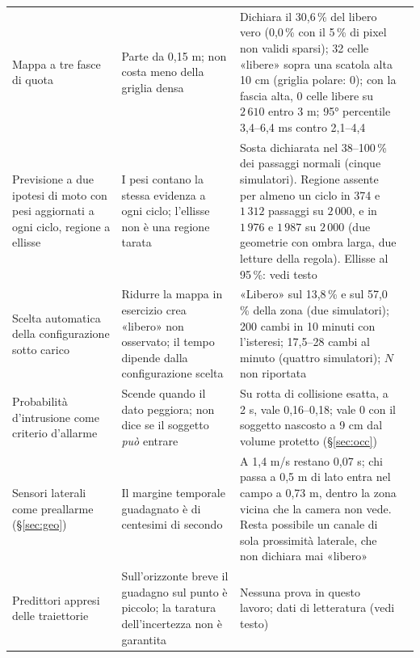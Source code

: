 \begin{table}[H]
\begin{tabularx}{\textwidth}{@{}>{\RaggedRight\arraybackslash}p{3.3cm}>{\RaggedRight\arraybackslash}p{4.4cm}Lc@{}}
Mappa a tre fasce di quota & Parte da 0,15 m; non costa meno della griglia densa & Dichiara il 30,6\,\% del libero vero (0,0\,\% con il 5\,\% di pixel non validi sparsi); 32 celle «libere» sopra una scatola alta 10 cm (griglia polare: 0); con la fascia alta, 0 celle libere su $2\,610$ entro 3 m; 95° percentile 3,4--6,4 ms contro 2,1--4,4 &  \\
Previsione a due ipotesi di moto con pesi aggiornati a ogni ciclo, regione a ellisse & I pesi contano la stessa evidenza a ogni ciclo; l'ellisse non è una regione tarata & Sosta dichiarata nel 38--100\,\% dei passaggi normali (cinque simulatori). Regione assente per almeno un ciclo in 374 e $1\,312$ passaggi su $2\,000$, e in $1\,976$ e $1\,987$ su $2\,000$ (due geometrie con ombra larga, due letture della regola). Ellisse al 95\,\%: vedi testo & \\
Scelta automatica della configurazione sotto carico & Ridurre la mappa in esercizio crea «libero» non osservato; il tempo dipende dalla configurazione scelta & «Libero» sul 13,8\,\% e sul 57,0\,\% della zona (due simulatori); 200 cambi in 10 minuti con l'isteresi; 17,5--28 cambi al minuto (quattro simulatori); $N$ non riportata & \\
Probabilità d'intrusione come criterio d'allarme & Scende quando il dato peggiora; non dice se il soggetto \emph{può} entrare & Su rotta di collisione esatta, a 2 s, vale 0,16--0,18; vale 0 con il soggetto nascosto a 9 cm dal volume protetto (\S\ref{sec:occ}) &  \\
Sensori laterali come preallarme (\S\ref{sec:geo}) & Il margine temporale guadagnato è di centesimi di secondo & A 1,4 m/s restano 0,07 s; chi passa a 0,5 m di lato entra nel campo a 0,73 m, dentro la zona vicina che la camera non vede. Resta possibile un canale di sola prossimità laterale, che non dichiara mai «libero» & \\
Predittori appresi delle traiettorie & Sull'orizzonte breve il guadagno sul punto è piccolo; la taratura dell'incertezza non è garantita & Nessuna prova in questo lavoro; dati di letteratura \cite{scholler2020,cheraghipouria2026} (vedi testo) & \\\bottomrule
\end{tabularx}
\end{table}

